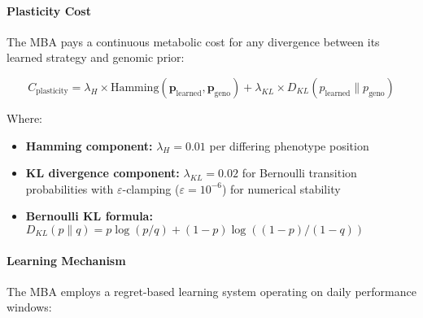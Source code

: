 \documentclass[aps,pre,twocolumn,floatfix,nofootinbib,amsmath,amssymb]{revtex4-2}
\begin{document}
\paragraph{Plasticity Cost}

The MBA pays a continuous metabolic cost for any divergence between its learned strategy and genomic prior:

\begin{equation}
C_{\text{plasticity}} = \lambda_H \times \text{Hamming}(\mathbf{p}_{\text{learned}}, \mathbf{p}_{\text{geno}}) + \lambda_{KL} \times D_{KL}(p_{\text{learned}} \| p_{\text{geno}})
\end{equation}

Where:
\begin{itemize}
\item \textbf{Hamming component:} $\lambda_H = 0.01$ per differing phenotype position
\item \textbf{KL divergence component:} $\lambda_{KL} = 0.02$ for Bernoulli transition probabilities with $\varepsilon$-clamping ($\varepsilon = 10^{-6}$) for numerical stability
\item \textbf{Bernoulli KL formula:} $D_{KL}(p \| q) = p \log(p/q) + (1-p) \log((1-p)/(1-q))$
\end{itemize}

\paragraph{Learning Mechanism}

The MBA employs a regret-based learning system operating on daily performance windows:
\end{document}
